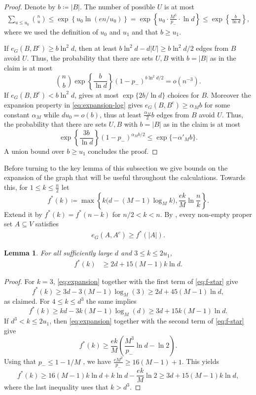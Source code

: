 \documentclass[10pt,a4paper]{article}
\newtheorem{lemma}[thm]{Lemma}
\begin{document}
\begin{proof}
Denote by $b \coloneqq |B|$. The number of possible $U$ is at most
\begin{align*}
    \sum_{u\le u_0}\binom nu \le\exp\left\{u_0\ln(en/u_0)\right\}=\exp\left\{u_0\cdot \frac{M^5}{p_-}\cdot \ln d \right\}\le \exp\left\{\frac{b}{\ln d}\right\},
\end{align*}
where we used the definition of $u_0$ and $u_1$ and that $b\ge u_1$.

If $e_G(B,B^c)\ge b\ln^2 d$, then at least $b\ln^2d-d|U|\ge b\ln^2 d/2$ edges from $B$ avoid $U$. Thus, the probability that there are sets $ U, B$ with $b=|B|$ as in the claim is at most
\[
 \binom nb\exp\left\{\frac{b}{\ln d}\right\}(1-p_-)^{b\ln^2 d/2}=o(n^{-3}).
\]
If $e_G(B,B^c)<b\ln^2 d$,  gives at most $\exp\{2b/\ln d\}$ choices for $B$.
Moreover the expansion property in \eqref{eq:expansion-log} gives $e_G(B,B^c)\ge \alpha_M b$ for some constant $\alpha_M$ while $du_0=o(b)$, thus at least $\frac{\alpha_M}{2} b$ edges from $B$ avoid $U$. Thus, the probability that there are sets $ U, B$ with $b=|B|$ as in the claim is at most
\[
 \exp\left\{\frac{3b}{\ln d}\right\}(1-p_-)^{\alpha_M b/2}\le\exp\{-\alpha'_M b\}.
\]
A union bound over $b \geq u_1$ concludes the proof.
\end{proof}

Before turning to the key lemma of this subsection we give bounds on the expansion of the graph that will be useful throughout the calculations.
Towards this, for $1 \leq k \leq \frac{n}{2}$ let
\begin{equation*}\label{eq:f-star}
 f^*(k)\coloneqq \max\left\{k\bigl(d-(M-1)\log_Mk\bigr),
             \frac{ek}{M}\ln\frac nk\right\}.
\end{equation*}
Extend it by $f^*(k)=f^*(n-k)$ for $n/2<k<n$.
By , every non-empty proper set $A\subseteq V$ satisfies
\begin{align} \label{eq:expansion}
    e_G(A,A^c)\ge f^*(|A|).
\end{align}

\begin{lemma}\label{lem:strong-boundary}
For all sufficiently large $d$ and $3\le k\le2u_1$,
\begin{align}
 f^*(k)&\ge2d+15 (M-1) k \ln d.\label{eq:strong-3d}
\end{align}
\end{lemma}

\begin{proof}
For $k=3$, \eqref{eq:expansion} together with the first term of \eqref{eq:f-star} give
\[
 f^*(k)\ge 3d- 3(M-1) \log_M(3) \geq 2d + 45(M-1) \ln d,
\]
as claimed. For $4 \leq k \le d^3$ the same implies
\[
f^*(k)\ge kd - 3k(M-1) \log_M(d) \geq 3d + 15k (M-1) \ln d.
\]
If $d^3<k\le2u_1$, then \eqref{eq:expansion} together with the second term of \eqref{eq:f-star} give
\[
 f^*(k)\ge\frac{ek}{M}\left(\frac{M^3}{p_-}\ln d-\ln 2\right).
\]
Using that $p_-\le1-1/M$
, we have $\frac{eM^2}{p_-} \geq 16(M-1)+1$. This yields
\[
 f^*(k)\ge 16(M-1) k \ln d + k \ln d - \frac{ek}{M} \ln 2 \geq 3d + 15(M-1)k \ln d,
\]
where the last inequality uses that $k>d^3$.
\end{proof}
\end{document}
